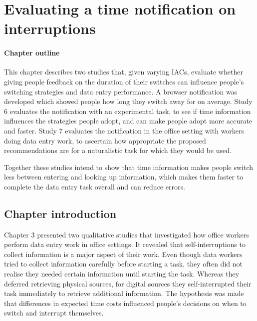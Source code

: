 \chapter{Evaluating a time notification on interruptions}

\begin{mynote}
\subsubsection{Chapter outline}
This chapter describes two studies that, given varying IACs, evaluate whether giving people feedback on the duration of their switches can influence people's switching strategies and data entry performance. A browser notification was developed which showed people how long they switch away for on average. Study 6 evaluates the notification with an experimental task, to see if time information influences the strategies people adopt, and can make people adopt more accurate and faster. Study 7 evaluates the notification in the office setting with workers doing data entry work, to ascertain how appropriate the proposed recommendations are for a naturalistic task for which they would be used.

Together these studies intend to show that time information makes people switch less between entering and looking up information, which makes them faster to complete the data entry task overall and can reduce errors.
\end{mynote}

\section{Chapter introduction}
Chapter 3 presented two qualitative studies that investigated how office workers perform data entry work in office settings. It revealed that self-interruptions to collect information is a major aspect of their work. Even though data workers tried to collect information carefully before starting a task, they often did not realise they needed certain information until starting the task. Whereas they deferred retrieving physical sources, for digital sources they self-interrupted their task immediately to retrieve additional information. The hypothesis was made that differences in expected time costs influenced people's decisions on when to switch and interrupt themselves.

